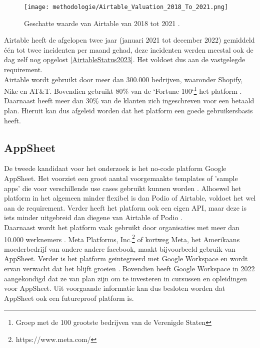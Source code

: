\begin{figure}[h]
    \centering
    \texttt{[image: methodologie/Airtable\_Valuation\_2018\_To\_2021.png]}
    \caption[Geschatte waarde Airtable]{Geschatte waarde van Airtable van 2018 tot 2021 \autocite{Khemchandani2023}.}
    \label{fig:airtable_value}
\end{figure}

Airtable heeft de afgelopen twee jaar (januari 2021 tot december 2022) gemiddeld één tot twee incidenten per maand gehad, deze incidenten werden meestal ook de dag zelf nog opgelost \autoref{AirtableStatus2023}. Het voldoet dus aan de vastgelegde requirement. \\

Airtable wordt gebruikt door meer dan 300.000 bedrijven, waaronder Shopify, Nike en AT\&T. Bovendien gebruikt 80\% van de `Fortune 100`\footnote{Groep met de 100 grootste bedrijven van de Verenigde Staten} het platform \autocite{Prokopets2022}. Daarnaast heeft meer dan 30\% van de klanten zich ingeschreven voor een betaald plan. Hieruit kan dus afgeleid worden dat het platform een goede gebruikersbasis heeft. \\


\subsection{AppSheet}

De tweede kandidaat voor het onderzoek is het no-code platform Google AppSheet. Het voorziet een groot aantal voorgemaakte templates of 'sample apps' die voor verschillende use cases gebruikt kunnen worden \autocite{AppSheetTemplates}. Alhoewel het platform in het algemeen minder flexibel is dan Podio of Airtable, voldoet het wel aan de requirement. Verder heeft het platform ook een eigen API, maar deze is iets minder uitgebreid dan diegene van Airtable of Podio \autocite{AppSheetAPI}. \\

Daarnaast wordt het platform vaak gebruikt door organisaties met meer dan 10.000 werknemers \autocite{Enlyft}. Meta Platforms, Inc.\footnote{https://www.meta.com/} of kortweg Meta, het Amerikaans moederbedrijf van ondere andere facebook, maakt bijvoorbeeld gebruik van AppSheet. Verder is het platform geïntegreerd met Google Workspace en wordt ervan verwacht dat het blijft groeien \autocite{Anand2022}. Bovendien heeft Google Workspace in 2022 aangekondigd dat ze van plan zijn om te investeren in cursussen en opleidingen voor AppSheet. Uit voorgaande informatie kan dus besloten worden dat AppSheet ook een futureproof platform is. \\ 

